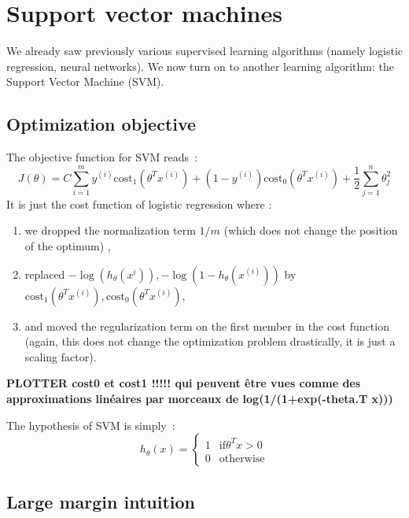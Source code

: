 \documentclass[10pt,a4paper]{article}
\begin{document}
\section{Support vector machines}

We already saw previously various supervised learning algorithms
(namely logistic regression, neural networks). We now turn on to
another learning algorithm: the Support Vector Machine (SVM).

\subsection{Optimization objective}

The objective function for SVM reads~:
\begin{equation}
J(\theta) = C \sum_{i=1}^m y^{(i)} \mathrm{cost}_1(\theta^T
x^{(i)}) + (1-y^{(i)}) \mathrm{cost}_0(\theta^T x^{(i)}) +
\frac{1}{2} \sum_{j=1}^n \theta_j^2
\end{equation}
It is just the cost function of logistic regression where :
\begin{enumerate}
\item we dropped
the normalization term $1/m$ (which does not change the position of
the optimum) ,
\item replaced $-\log(h_\theta(x^{i})),
-\log(1-h_\theta(x^{(i)}))$ by $\mathrm{cost}_1(\theta^T x^{(i)}),
\mathrm{cost}_0(\theta^T x^{(i)})$,
\item and moved the regularization term on the first member in the
  cost function (again, this does not change the optimization problem
  drastically, it is just a scaling factor).
\end{enumerate}

\textbf{PLOTTER cost0 et cost1 !!!!! qui peuvent être vues comme des
  approximations linéaires par morceaux de log(1/(1+exp(-theta.T x)))}


The hypothesis of SVM is simply~:
\begin{equation}
h_\theta(x) = \begin{cases}
1 & \mathrm{if } \theta^T x > 0\\
0 & \mathrm{otherwise} 
\end{cases}
\end{equation}

\subsection{Large margin intuition}
\end{document}
